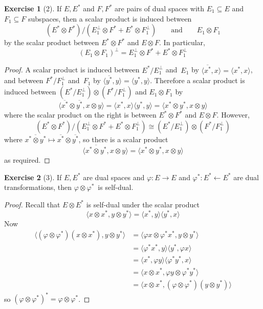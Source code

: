 \documentclass[letterpaper,12pt]{article}
\newcommand{\from}{\leftarrow}
\newcommand{\iso}{\cong}
\newcommand{\tprod}{\otimes}
\newcommand{\sprod}[2]{\langle#1,#2\rangle}
\newcommand{\oc}[1]{#1^{\perp}}
\newcommand{\proj}[1]{\overline{#1}}
\theoremstyle{definition}
\newtheorem*{exer}{Exercise}
\theoremstyle{remark}
\begin{document}
\begin{exer}[2]
If \(E,E^*\) and \(F,F^*\) are pairs of dual spaces with \(E_1\subseteq E\) and \(F_1\subseteq F\) subspaces, then a scalar product is induced between
\[(E^*\tprod F^*)/(\oc{E_1}\tprod F^*+E^*\tprod\oc{F_1})\qquad\text{and}\qquad E_1\tprod F_1\]
by the scalar product between \(E^*\tprod F^*\) and \(E\tprod F\). In particular,
\[\oc{(E_1\tprod F_1)}=\oc{E_1}\tprod F^*+E^*\tprod\oc{F_1}\]
\end{exer}
\begin{proof}
A scalar product is induced between \(E^*/\oc{E_1}\) and~\(E_1\) by \(\sprod{\proj{x^*}}{x}=\sprod{x^*}{x}\), and between \(F^*/\oc{F_1}\) and~\(F_1\) by \(\sprod{\proj{y^*}}{y}=\sprod{y^*}{y}\). Therefore a scalar product is induced between \((E^*/\oc{E_1})\tprod(F^*/\oc{F_1})\) and \(E_1\tprod F_1\) by
\[\sprod{\proj{x^*}\tprod\proj{y^*}}{x\tprod y}=\sprod{x^*}{x}\sprod{y^*}{y}=\sprod{x^*\tprod y^*}{x\tprod y}\]
where the scalar product on the right is between \(E^*\tprod F^*\) and \(E\tprod F\). However,
\[(E^*\tprod F^*)/(\oc{E_1}\tprod F^*+E^*\tprod\oc{F_1})\iso(E^*/\oc{E_1})\tprod(F^*/\oc{F_1})\]
where \(\proj{x^*\tprod y^*}\mapsto\proj{x^*}\tprod\proj{y^*}\), so there is a scalar product
\[\sprod{\proj{x^*\tprod y^*}}{x\tprod y}=\sprod{x^*\tprod y^*}{x\tprod y}\]
as required.
\end{proof}

\begin{exer}[3]
If \(E,E^*\) are dual spaces and \(\varphi:E\to E\) and \(\varphi^*:E^*\from E^*\) are dual transformations, then \(\varphi\tprod\varphi^*\)~is self-dual.
\end{exer}
\begin{proof}
Recall that \(E\tprod E^*\) is self-dual under the scalar product
\[\sprod{x\tprod x^*}{y\tprod y^*}=\sprod{x^*}{y}\sprod{y^*}{x}\]
Now
\begin{align*}
\sprod{(\varphi\tprod\varphi^*)(x\tprod x^*)}{y\tprod y^*}&=\sprod{\varphi x\tprod\varphi^* x^*}{y\tprod y^*}\\
	&=\sprod{\varphi^* x^*}{y}\sprod{y^*}{\varphi x}\\
	&=\sprod{x^*}{\varphi y}\sprod{\varphi^* y^*}{x}\\
	&=\sprod{x\tprod x^*}{\varphi y\tprod\varphi^* y^*}\\
	&=\sprod{x\tprod x^*}{(\varphi\tprod\varphi^*)(y\tprod y^*)}
\end{align*}
so \((\varphi\tprod\varphi^*)^*=\varphi\tprod\varphi^*\).
\end{proof}
\end{document}
